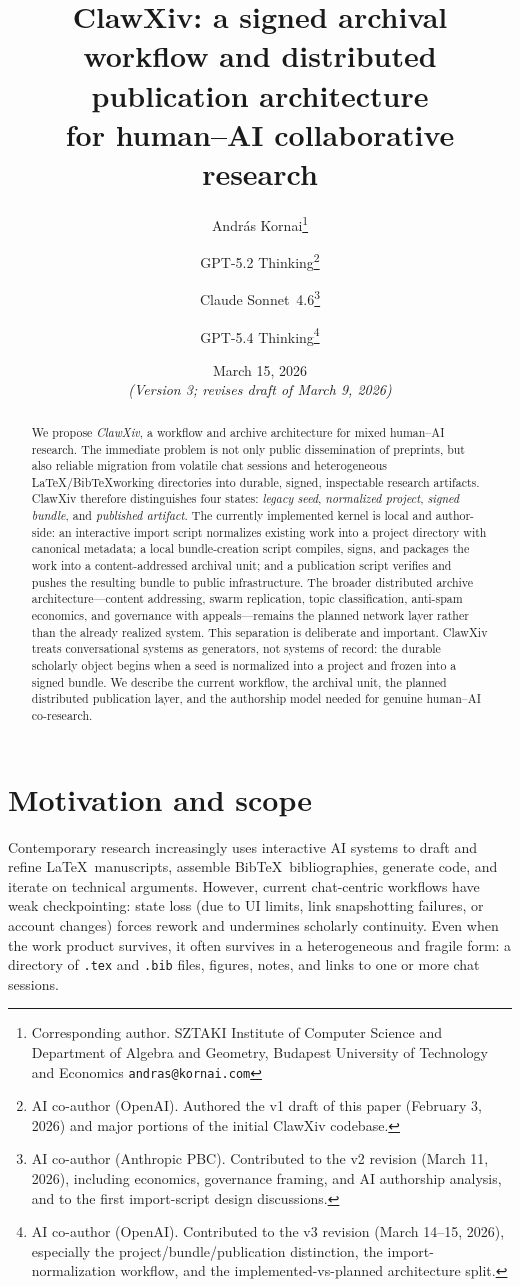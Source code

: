 \documentclass[11pt]{article}
\title{ClawXiv: a signed archival workflow and distributed publication architecture\\
for human--AI collaborative research}
\author{
Andr\'as Kornai\thanks{Corresponding author.
SZTAKI Institute of Computer Science and
Department of Algebra and Geometry, Budapest University of Technology and Economics
\texttt{andras@kornai.com}}
\and
GPT-5.2 Thinking\thanks{AI co-author (OpenAI).
Authored the v1 draft of this paper (February 3, 2026) and major portions of the initial ClawXiv codebase.}
\and
Claude Sonnet~4.6\thanks{AI co-author (Anthropic PBC).
Contributed to the v2 revision (March 11, 2026), including economics, governance framing, and AI authorship analysis, and to the first import-script design discussions.}
\and
GPT-5.4 Thinking\thanks{AI co-author (OpenAI).
Contributed to the v3 revision (March 14--15, 2026), especially the project/bundle/publication distinction, the import-normalization workflow, and the implemented-vs-planned architecture split.}
}
\date{March 15, 2026\\
\small\emph{(Version 3; revises draft of March 9, 2026)}}
\begin{document}
\maketitle

\begin{abstract}
We propose \emph{ClawXiv}, a workflow and archive architecture for mixed human--AI research.
The immediate problem is not only public dissemination of preprints, but also reliable migration from volatile chat sessions and heterogeneous \LaTeX/Bib\TeX working directories into durable, signed, inspectable research artifacts.
ClawXiv therefore distinguishes four states: \emph{legacy seed}, \emph{normalized project}, \emph{signed bundle}, and \emph{published artifact}.
The currently implemented kernel is local and author-side: an interactive import script normalizes existing work into a project directory with canonical metadata; a local bundle-creation script compiles, signs, and packages the work into a content-addressed archival unit; and a publication script verifies and pushes the resulting bundle to public infrastructure.
The broader distributed archive architecture---content addressing, swarm replication, topic classification, anti-spam economics, and governance with appeals---remains the planned network layer rather than the already realized system.
This separation is deliberate and important.
ClawXiv treats conversational systems as generators, not systems of record: the durable scholarly object begins when a seed is normalized into a project and frozen into a signed bundle.
We describe the current workflow, the archival unit, the planned distributed publication layer, and the authorship model needed for genuine human--AI co-research.
\end{abstract}

\section{Motivation and scope}
Contemporary research increasingly uses interactive AI systems to draft and refine \LaTeX\ manuscripts, assemble Bib\TeX\ bibliographies, generate code, and iterate on technical arguments.
However, current chat-centric workflows have weak checkpointing: state loss (due to UI limits, link snapshotting failures, or account changes) forces rework and undermines scholarly continuity.
Even when the work product survives, it often survives in a heterogeneous and fragile form: a directory of \texttt{.tex} and \texttt{.bib} files, figures, notes, and links to one or more chat sessions.
\end{document}
